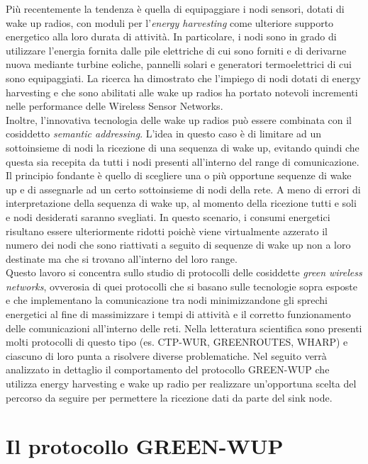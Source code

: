 \documentclass[binding=0.6cm,TFA]{sapthesis}
\begin{document}
Più recentemente la tendenza è quella di equipaggiare i nodi sensori, dotati di wake up radios, con moduli per l'\emph{energy harvesting} come ulteriore
supporto energetico alla loro durata di attività. In particolare, i nodi sono in grado di utilizzare l'energia fornita dalle pile elettriche di cui sono
forniti e di derivarne nuova mediante turbine eoliche, pannelli solari e generatori termoelettrici di cui sono equipaggiati. La ricerca ha dimostrato che
l'impiego di nodi dotati di energy harvesting \cite{energy-harvesting-paper} e che sono abilitati alle wake up radios \cite{wake-up-radios-paper} ha
portato notevoli incrementi nelle performance delle Wireless Sensor Networks.\\

Inoltre, l'innovativa tecnologia delle wake up radios può essere combinata con il cosiddetto \emph{semantic addressing}. L'idea in questo caso è di limitare
ad un sottoinsieme di nodi la ricezione di una sequenza di wake up, evitando quindi che questa sia recepita da tutti i nodi presenti all'interno
del range di comunicazione. Il principio fondante è quello di scegliere una o più opportune sequenze di wake up e di assegnarle ad un certo
sottoinsieme di nodi della rete. A meno di errori di interpretazione della sequenza di wake up, al momento della ricezione tutti e soli e nodi desiderati
saranno svegliati. In questo scenario, i consumi energetici risultano essere ulteriormente ridotti poichè viene virtualmente azzerato il numero dei nodi
che sono riattivati a seguito di sequenze di wake up non a loro destinate ma che si trovano all'interno del loro range.\\

Questo lavoro si concentra sullo studio di protocolli delle cosiddette \emph{green wireless networks}, ovverosia di quei protocolli che si basano
sulle tecnologie sopra esposte e che implementano la comunicazione tra nodi minimizzandone gli sprechi energetici al fine di massimizzare
i tempi di attività e il corretto funzionamento delle comunicazioni all'interno delle reti. Nella letteratura scientifica
sono presenti molti protocolli di questo tipo (es. CTP-WUR, GREENROUTES, WHARP) e ciascuno di loro punta a risolvere diverse problematiche.
Nel seguito verrà analizzato in dettaglio il comportamento del protocollo GREEN-WUP che utilizza energy harvesting e wake up radio per realizzare
un'opportuna scelta del percorso da seguire per permettere la ricezione dati da parte del sink node.\\

\chapter{Il protocollo GREEN-WUP}
\end{document}
